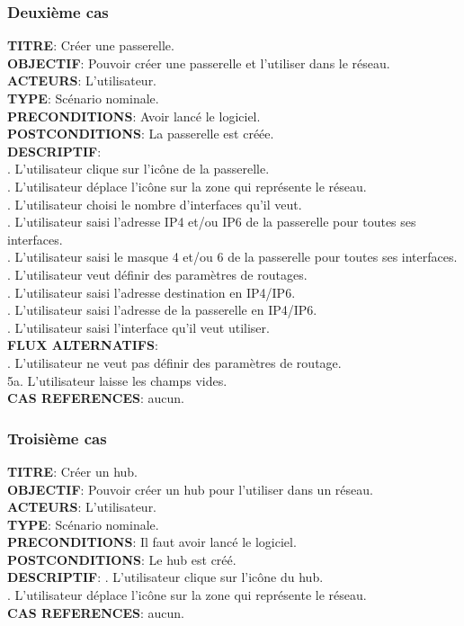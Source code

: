 \subsubsection{Deuxième cas}
\noindent\textbf{TITRE}: Créer une passerelle.\\
\textbf{OBJECTIF}: Pouvoir créer une passerelle et l’utiliser dans le réseau.\\
\textbf{ACTEURS}: L’utilisateur.\\
\textbf{TYPE}: Scénario nominale.\\
\textbf{PRECONDITIONS}: Avoir lancé le logiciel.\\
\textbf{POSTCONDITIONS}: La passerelle est créée.\\
\textbf{DESCRIPTIF}:\\
. L’utilisateur clique sur l’icône de la passerelle.\\
. L’utilisateur déplace l’icône sur la zone qui représente le réseau.\\
. L’utilisateur choisi le nombre d’interfaces qu’il veut.\\
. L’utilisateur saisi l’adresse IP4 et/ou IP6 de la passerelle pour toutes ses interfaces.\\
. L’utilisateur saisi le masque 4 et/ou 6 de la passerelle pour toutes ses interfaces.\\
. L’utilisateur veut définir des paramètres de routages.\\
. L’utilisateur saisi l’adresse destination en IP4/IP6.\\
. L’utilisateur saisi l’adresse de la passerelle en IP4/IP6.\\
. L’utilisateur saisi l’interface qu’il veut utiliser.\\
\textbf{FLUX ALTERNATIFS}:\\
. L'utilisateur ne veut pas définir des paramètres de routage.\\
\indent\indent5a. L'utilisateur laisse les champs vides.\\
\textbf{CAS REFERENCES}: aucun.\\


\subsubsection{Troisième cas}
\noindent\textbf{TITRE}: Créer un hub.\\
\textbf{OBJECTIF}: Pouvoir créer un hub pour l’utiliser dans un réseau.\\
\textbf{ACTEURS}: L’utilisateur.\\
\textbf{TYPE}: Scénario nominale.\\
\textbf{PRECONDITIONS}: Il faut avoir lancé le logiciel.\\
\textbf{POSTCONDITIONS}: Le hub est créé.\\
\textbf{DESCRIPTIF}: 
. L’utilisateur clique sur l’icône du hub.\\
. L’utilisateur déplace l’icône sur la zone qui représente le réseau.\\
\textbf{CAS REFERENCES}: aucun.\\



